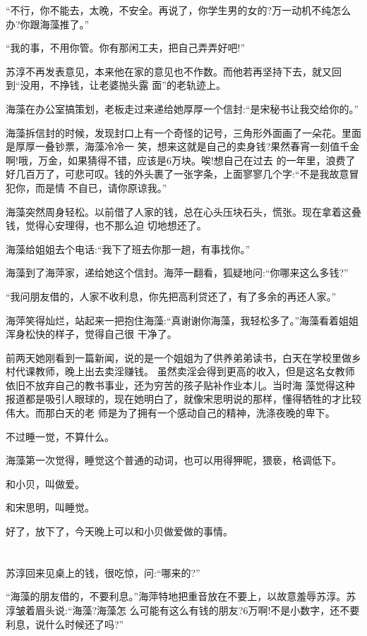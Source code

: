 \documentclass[11pt,a4paper,onecolumn]{article}
\begin{document}
``不行，你不能去，太晚，不安全。再说了，你学生男的女的?万一动机不纯怎么办?你跟海藻推了。''

``我的事，不用你管。你有那闲工夫，把自己弄弄好吧!''

苏淳不再发表意见，本来他在家的意见也不作数。而他若再坚持下去，就又回到``没用，不挣钱，让老婆抛头露
面''的老轨迹上。

海藻在办公室搞策划，老板走过来递给她厚厚一个信封:``是宋秘书让我交给你的。''

海藻拆信封的时候，发现封口上有一个奇怪的记号，三角形外面画了一朵花。里面是厚厚一叠钞票，海藻冷冷一
笑，想来这就是自己的卖身钱?果然春宵一刻值千金啊!哦，万金，如果猜得不错，应该是6万块。唉!想自己在过去
的一年里，浪费了好几百万了，可悲可叹。钱的外头裹了一张字条，上面寥寥几个字:``不是我故意冒犯你，而是情
不自已，请你原谅我。''

海藻突然周身轻松。以前借了人家的钱，总在心头压块石头，慌张。现在拿着这叠钱，觉得心安理得，也不那么迫
切地想还了。

海藻给姐姐去个电话:``我下了班去你那一趟，有事找你。''

海藻到了海萍家，递给她这个信封。海萍一翻看，狐疑地问:``你哪来这么多钱?''

``我问朋友借的，人家不收利息，你先把高利贷还了，有了多余的再还人家。''

海萍笑得灿烂，站起来一把抱住海藻:``真谢谢你海藻，我轻松多了。''海藻看着姐姐浑身松快的样子，觉得自己很
干净了。

前两天她刚看到一篇新闻，说的是一个姐姐为了供养弟弟读书，白天在学校里做乡村代课教师，晚上出去卖淫赚钱。
虽然卖淫会得到更高的收入，但是这名女教师依旧不放弃自己的教书事业，还为穷苦的孩子贴补作业本儿。当时海
藻觉得这种报道都是吸引人眼球的，现在她明白了，就像宋思明说的那样，懂得牺牲的才比较伟大。而那白天的老
师是为了拥有一个感动自己的精神，洗涤夜晚的卑下。

不过睡一觉，不算什么。

海藻第一次觉得，睡觉这个普通的动词，也可以用得狎昵，猥亵，格调低下。

和小贝，叫做爱。

和宋思明，叫睡觉。

好了，放下了，今天晚上可以和小贝做爱做的事情。

\section[\thesection]{}

苏淳回来见桌上的钱，很吃惊，问:``哪来的?''

``海藻的朋友借的，不要利息。''海萍特地把重音放在不要上，以故意羞辱苏淳。苏淳皱着眉头说:``海藻?海藻怎
么可能有这么有钱的朋友?6万啊!不是小数字，还不要利息，说什么时候还了吗?''
\end{document}

